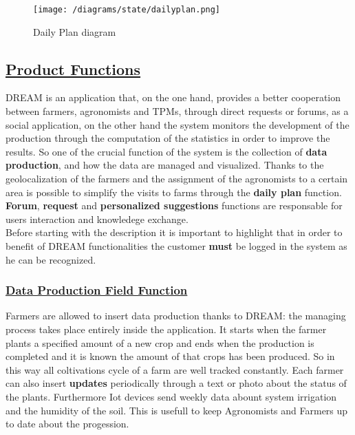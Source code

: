 		\vspace{0.3cm}
		\begin{figure}[h]
			\centering
			\texttt{[image: /diagrams/state/dailyplan.png]}
			\caption{\label{fig:dailyplanState}Daily Plan diagram}
		\end{figure}      

\subsection[Product Functions]{\hyperlink{toc}{Product Functions}}
	\label{sec:productFunctions}
	DREAM is an application that, on the one hand, provides a better cooperation between farmers, agronomists and TPMs, through direct requests or forums, as a social application, on the other hand the system monitors the development of the production through the computation of the statistics in order to improve the results. So one of the crucial function of the system is the collection of \textbf{data production}, and how the data are managed and visualized. Thanks to the geolocalization of the farmers and the assignment of the agronomists to a certain area is possible to simplify the visits to farms through the \textbf{daily plan} function. \textbf{Forum}, \textbf{request} and \textbf{personalized suggestions} functions are responsable for users interaction and knowledege exchange.\\
	
	Before starting with the description it is important to highlight that in order to benefit of DREAM functionalities the customer \textbf{must} be logged in the system as he can be recognized.
	
	\subsubsection[Data Production Field Function]{\hyperlink{toc}{Data Production Field Function}}
		\label{sec:dataproductionFunction}
		Farmers are allowed to insert data production thanks to DREAM: the managing process takes place entirely inside the application. It starts when the farmer plants a specified amount of a new crop and ends when the production is completed and it is known the amount of that crops has been produced. So in this way all coltivations cycle of a farm are well tracked constantly. Each farmer can also insert \textbf{updates} periodically through a text or photo about the status of the plants. Furthermore Iot devices send weekly data abount system irrigation and the humidity of the soil. This is usefull to keep Agronomists and Farmers up to date about the progession.  \\
		
